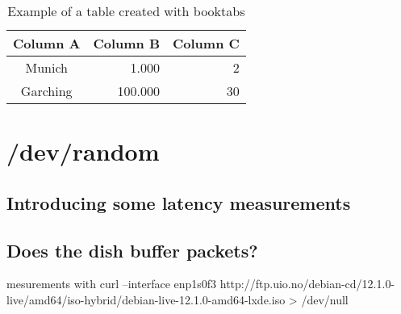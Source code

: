 \documentclass[IN,11pt,twoside,openright,bachelor,english]{tumthesis}
\begin{document}
\begin{table}
	\centering
	\begin{tabular}{c r r}
		\toprule
		Column A & Column B & Column C \\
		\midrule
		Munich   &    1.000 &        2 \\
		Garching &  100.000 &       30 \\
		\bottomrule
	\end{tabular}
	\caption{Example of a table created with booktabs}
	\label{tab:tabular}
\end{table}


\chapter{/dev/random}

\section{Introducing some latency measurements}
\section{Does the dish buffer packets?}
mesurements with  curl --interface enp1s0f3 http://ftp.uio.no/debian-cd/12.1.0-live/amd64/iso-hybrid/debian-live-12.1.0-amd64-lxde.iso > /dev/null

\appendix


\clearpage
\pagestyle{thesischapter}

\cleardoublepage
{}
\printbibliography[heading=bibintoc]

\clearpage
\pagestyle{empty}
\end{document}
